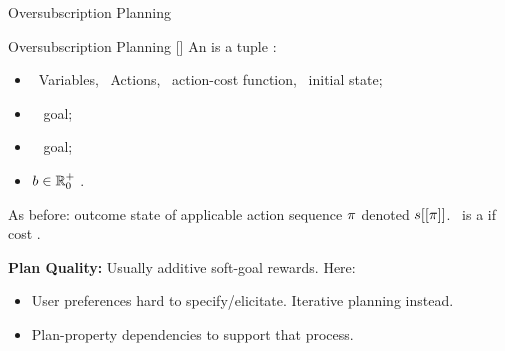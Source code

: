\begin{frame}{Oversubscription Planning}

\begin{block}{Oversubscription Planning \hfill {\footnotesize [\cite{smith:icaps-04,domshlak:mirkis:jair-15}]}}
An  is a tuple \textred{$\task =
(\vars,\allowbreak\acts,\allowbreak\cost,\allowbreak\init,\allowbreak\goalhard,\allowbreak\goalsoft,\allowbreak\costbound)$}:
\begin{itemize}
\item \vars\ Variables, \acts\ Actions, \cost\ action-cost function, 
\init\ initial state;
\item \goalhard\  goal;
\item \goalsoft\  goal;
\item ${b} \in {\mathbb{R}}^+_0$ .
\end{itemize}
As before: outcome state of applicable action sequence $\pi$ denoted
$s[[\pi]]$. \plan\ is a  if
cost .
%
%
\end{block}

\bigskip \pause

\textbf{Plan Quality:} Usually additive soft-goal rewards. \pause Here:

\begin{itemize}
\item User preferences hard to specify/elicitate. Iterative planning instead.
\item Plan-property dependencies to support that process.
\end{itemize}

\medskip

\end{frame}


